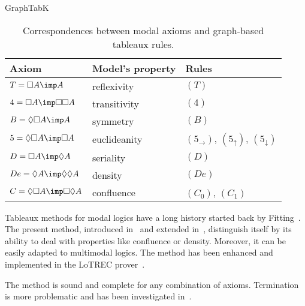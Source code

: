 \begin{entry}{GraphTabK}
\begin{clarifications}
  \begin{table}
  \center
  \begin{tabular}{l l l}
    Axiom & Model's property & Rules \\
    \hline
    $T = \Box A \imp A$ & reflexivity & $(T)$ \\
    $4 = \Box A \imp \Box\Box A$ & transitivity & $(4)$ \\
    $B = \Diamond\Box A \imp A$ & symmetry & $(B)$ \\
    $5 = \Diamond\Box A \imp \Box A$ & euclideanity &
      $(5_{\mathord\rightarrow})$, $(5_{\mathord\uparrow})$, $(5_{\mathord\downarrow})$ \\
    $D = \Box A \imp \Diamond A$ & seriality & $(D)$ \\
    $De = \Diamond A \imp \Diamond\Diamond A$ & density & $(De)$ \\
    $C = \Diamond\Box A \imp \Box\Diamond A$ & confluence & $(C_0)$, $(C_1)$
  \end{tabular}
  \caption{Correspondences between modal axioms and graph-based tableaux rules.}
  \label{tab:GraphTabK}
  \end{table}
\end{clarifications}

\begin{history}
  Tableaux methods for modal logics have a long history started back by Fitting~\cite{fitting.1972}.
  The present method, introduced in~\cite{castilho-farinas-gasquet-herzig.1997} and extended in~\cite{farinas-gasquet.2002},
  distinguish itself by its ability to deal with properties like confluence or density.
  Moreover, it can be easily adapted to multimodal logics.
  The method has been enhanced and implemented in the LoTREC prover~\cite{gasquet-herzig-said-schwarzentruber.2014}.
\end{history}

\begin{technicalities}
  The method is sound and complete for any combination of axioms.
  Termination is more problematic
  and has been investigated in~\cite{farinas-gasquet.2002,gasquet-herzig-sahade.2006,gasquet-herzig-said-schwarzentruber.2014}.
\end{technicalities}


\end{entry}
